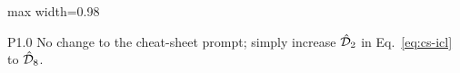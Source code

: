 \begin{table}[t]
\begin{adjustbox}{max width=0.98\textwidth}
\begin{tabular}{P{1.0\textwidth}}
    {No change to the cheat-sheet prompt; simply increase $\hat{\mathcal{D}}_2$ in Eq.~\eqref{eq:cs-icl} to $\hat{\mathcal{D}}_8$.} \\

    \bottomrule
  \end{tabular}
\end{adjustbox}
\caption{Descriptions of tested prompt variants and complete prompt text.}
\label{tab:prompt_var_desc}
\end{table}
